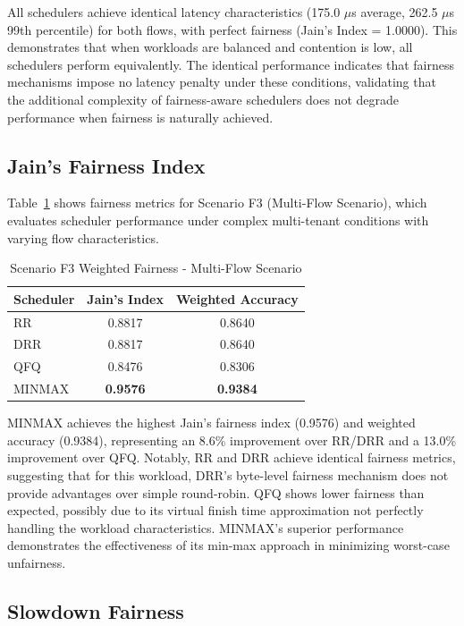 \documentclass[11pt]{article}
\begin{document}
All schedulers achieve identical latency characteristics (175.0 $\mu$s average, 262.5 $\mu$s 99th percentile) for both flows, with perfect fairness (Jain's Index = 1.0000). This demonstrates that when workloads are balanced and contention is low, all schedulers perform equivalently. The identical performance indicates that fairness mechanisms impose no latency penalty under these conditions, validating that the additional complexity of fairness-aware schedulers does not degrade performance when fairness is naturally achieved.

\subsection{Jain's Fairness Index}

Table~\ref{tab:f3-fairness} shows fairness metrics for Scenario F3 (Multi-Flow Scenario), which evaluates scheduler performance under complex multi-tenant conditions with varying flow characteristics.

\begin{table}[h]
\centering
\caption{Scenario F3 Weighted Fairness - Multi-Flow Scenario}
\label{tab:f3-fairness}
\begin{tabular}{lcc}
\toprule
Scheduler & Jain's Index & Weighted Accuracy \\
\midrule
RR   & 0.8817 & 0.8640 \\
DRR  & 0.8817 & 0.8640 \\
QFQ  & 0.8476 & 0.8306 \\
MINMAX & \textbf{0.9576} & \textbf{0.9384} \\
\bottomrule
\end{tabular}
\end{table}

MINMAX achieves the highest Jain's fairness index (0.9576) and weighted accuracy (0.9384), representing an 8.6\% improvement over RR/DRR and a 13.0\% improvement over QFQ. Notably, RR and DRR achieve identical fairness metrics, suggesting that for this workload, DRR's byte-level fairness mechanism does not provide advantages over simple round-robin. QFQ shows lower fairness than expected, possibly due to its virtual finish time approximation not perfectly handling the workload characteristics. MINMAX's superior performance demonstrates the effectiveness of its min-max approach in minimizing worst-case unfairness.

\subsection{Slowdown Fairness}
\end{document}
